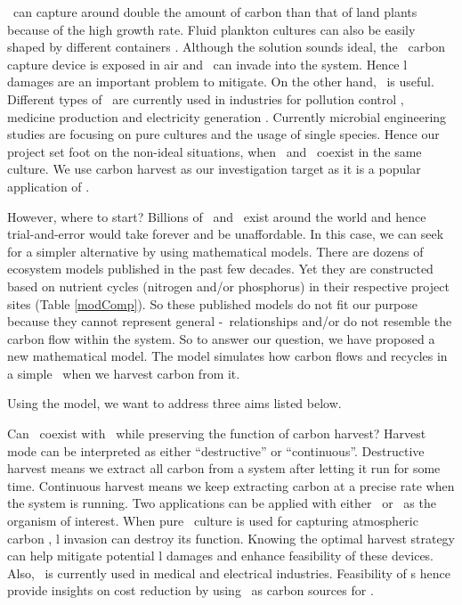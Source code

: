 \documentclass[../thesis.tex]{subfiles} %
\begin{document}
\Phy\ can capture around double the amount of carbon than that of land plants \autocite{SCHLESINGER2013341} because of the high growth rate.  Fluid plankton cultures can also be easily shaped by different containers \autocite{evanson_2019}.  Although the solution sounds ideal, the \phy\ carbon capture device is exposed in air and \bac\ can invade into the system.  Hence \bac l damages are an important problem to mitigate.  On the other hand, \bac\ is useful.  Different types of \bac\ are currently used in industries for pollution control \autocite{dash2013marine,naik2013lead}, medicine production \autocite{huang2012industrial} and electricity generation \autocite{songera2012electricity}.  Currently microbial engineering studies are focusing on pure cultures and the usage of single species.  Hence our project set foot on the non-ideal situations, when \bac\ and \phy\ coexist in the same culture.  We use carbon harvest as our investigation target as it is a popular application of \phy.

However, where to start?  Billions of \phy\ and \bac\ exist around the world and hence trial-and-error would take forever and be unaffordable.  In this case, we can seek for a simpler alternative by using mathematical models.  There are dozens of ecosystem models published in the past few decades.  Yet they are constructed based on nutrient cycles (nitrogen and/or phosphorus) in their respective project sites (Table \ref{modComp}).  So these published models do not fit our purpose because they cannot represent general \phy-\bac\ relationships and/or do not resemble the carbon flow within the system.  So to answer our question, we have proposed a new mathematical model.  The model simulates how carbon flows and recycles in a simple \pbs\ when we harvest carbon from it.

Using the model, we want to address three aims listed below.

Can \bac\ coexist with \phy\ while preserving the function of carbon harvest?  Harvest mode can be interpreted as either ``destructive” or ``continuous”.  Destructive harvest means we extract all carbon from a system after letting it run for some time.  Continuous harvest means we keep extracting carbon at a precise rate when the system is running.  Two applications can be applied with either \phy\ or \bac\ as the organism of interest.  When pure \phy\ culture is used for capturing atmospheric carbon \autocite{evanson_2019}, \bac l invasion can destroy its function.  Knowing the optimal harvest strategy can help mitigate potential \bac l damages and enhance feasibility of these devices.  Also, \bac\ is currently used in medical and electrical industries.  Feasibility of \pbs s hence provide insights on cost reduction by using \phy\ as carbon sources for \bac.
\end{document}

